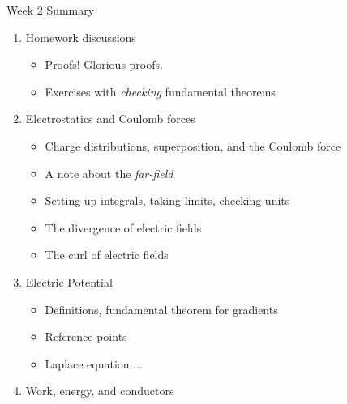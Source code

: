 \documentclass{beamer}
\begin{document}
\begin{frame}{Week 2 Summary}
\begin{enumerate}
\item Homework discussions
\begin{itemize}
\item Proofs!  Glorious proofs.
\item Exercises with \textit{checking} fundamental theorems
\end{itemize}
\item Electrostatics and Coulomb forces
\begin{itemize}
\item Charge distributions, superposition, and the Coulomb force
\item A note about the \textit{far-field}
\item Setting up integrals, taking limits, checking units
\item The divergence of electric fields
\item The curl of electric fields
\end{itemize}
\item Electric Potential
\begin{itemize}
\item Definitions, fundamental theorem for gradients
\item Reference points
\item Laplace equation ...
\end{itemize}
\item Work, energy, and conductors
\end{enumerate}
\end{frame}
\end{document}

